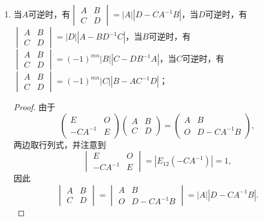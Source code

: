 \begin{enumerate}
\begin{proof}
\[\begin{vmatrix}
                      A & O \\ O & B
                  \end{vmatrix} = \begin{vmatrix}
                      A & O \\ O & E_r
                  \end{vmatrix} \begin{vmatrix}
                      E_k & O \\ O & B
                  \end{vmatrix} = |A||B|.
              \]
              其余推导部分同上.
          \end{proof}

    \item 当$A$可逆时，有$\begin{vmatrix}
                  A & B \\ C & D
              \end{vmatrix} = |A||D-CA^{-1}B|$，当$D$可逆时，有$\begin{vmatrix}
                  A & B \\ C & D
              \end{vmatrix} = |D||A-BD^{-1}C|$，当$B$可逆时，有$\begin{vmatrix}
                  A & B \\ C & D
              \end{vmatrix} = (-1)^{mn}|B||C-DB^{-1}A|$，当$C$可逆时，有$\begin{vmatrix}
                  A & B \\ C & D
              \end{vmatrix} = (-1)^{mn}|C||B-AC^{-1}D|$；
          \begin{proof}
              由于
              \[\begin{pmatrix}
                      E & O \\ -CA^{-1} & E
                  \end{pmatrix}\begin{pmatrix}
                      A & B \\ C & D
                  \end{pmatrix}= \begin{pmatrix}
                      A & B \\ O & D-CA^{-1}B
                  \end{pmatrix},\]
              两边取行列式，并注意到
              \[\begin{vmatrix}
                      E & O \\ -CA^{-1} & E
                  \end{vmatrix} = |E_{12}(-CA^{-1})| = 1,\]
              因此
              \[\begin{vmatrix}
                      A & B \\ C & D
                  \end{vmatrix}=\begin{vmatrix}
                      A & B \\ O & D-CA^{-1}B
                  \end{vmatrix}=|A||D-CA^{-1}B|.\]


\end{proof}
\end{enumerate}
